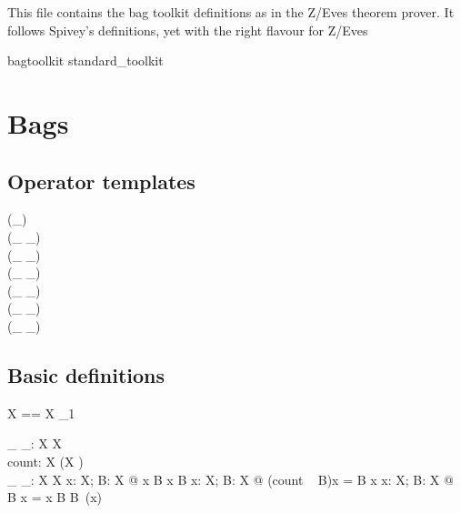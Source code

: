 \documentclass[draft,a4paper,10pt,wd]{article}
\begin{document}
This file contains the bag toolkit definitions as in the Z/Eves
theorem prover. It follows Spivey's definitions, yet with the
right flavour for Z/Eves

\begin{zsection}
\SECTION bagtoolkit \parents standard\_toolkit
\end{zsection}

\section{Bags }\label{def-bag}

\subsection*{Operator templates}

\begin{zed}
    \generic (\bag \_) \\
     \leftassoc (\_ \bcount \_) \\
     \leftassoc (\_ \otimes \_) \\
    \relation (\_ \inbag \_) \\
    \relation (\_ \subbageq \_) \\
     \leftassoc (\_ \uplus \_) \\
     \leftassoc (\_ \uminus \_)
\end{zed}

\subsection*{Basic definitions}

\begin{zed}
  \bag X == X \pfun \nat_1
\end{zed}

\begin{gendef}[X]
  \_ \inbag \_: X \rel \bag X \\
  count: \bag X \fun (X \fun \nat) \\
  \_ \bcount \_: \bag X \cross X \fun \nat
\where
  \forall x: X; B: \bag X @ x \inbag B \iff x \in \dom B
\also
  \forall x: X; B: \bag X @ (count ~ B)x = B \bcount x
\also
  \forall x: X; B: \bag X @ B \bcount x =
    \IF x \inbag B \THEN B~(x) 
\end{gendef}
\end{document}
